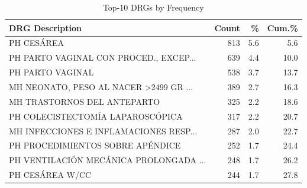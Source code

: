 \begin{table}[t]
\centering
\caption{Top-10 DRGs by Frequency}
\label{tab:top_drgs}
\scriptsize
\begin{tabular}{p{4.2cm}rrr}
\toprule
\textbf{DRG Description} & \textbf{Count} & \textbf{\%} & \textbf{Cum.\%} \\
\midrule
    PH CESÁREA & 813 & 5.6 & 5.6 \\
    PH PARTO VAGINAL CON PROCED., EXCEP... & 639 & 4.4 & 10.0 \\
    PH PARTO VAGINAL & 538 & 3.7 & 13.7 \\
    MH NEONATO, PESO AL NACER {>}2499 GR ... & 389 & 2.7 & 16.3 \\
    MH TRASTORNOS DEL ANTEPARTO & 325 & 2.2 & 18.6 \\
    PH COLECISTECTOMÍA LAPAROSCÓPICA & 317 & 2.2 & 20.7 \\
    MH INFECCIONES E INFLAMACIONES RESP... & 287 & 2.0 & 22.7 \\
    PH PROCEDIMIENTOS SOBRE APÉNDICE & 252 & 1.7 & 24.4 \\
    PH VENTILACIÓN MECÁNICA PROLONGADA ... & 248 & 1.7 & 26.2 \\
    PH CESÁREA W/CC & 244 & 1.7 & 27.8 \\
\bottomrule
\end{tabular}
\end{table}